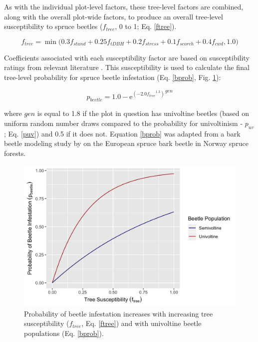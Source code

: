 \documentclass[a4paper, 12pt] {report}
\begin{document}
As with the individual plot-level factors, these tree-level factors are combined, along with the overall plot-wide factors, to produce an overall tree-level susceptibility to spruce beetles ($f_{tree}$, 0 to 1; Eq. \ref{ftree}). 

\begin{equation} \label{ftree}
f_{tree} = \min\Big(0.3f_{stand} + 0.25f_{tDBH} + 0.2f_{stress} + 0.1f_{scorch} + 0.4f_{cwd}, 1.0\Big)
\end{equation}

Coefficients associated with each susceptibility factor are based on susceptibility ratings from relevant literature . This susceptibility is used to calculate the final tree-level probability for spruce beetle infestation (Eq. \ref{bprob}, Fig. \ref{fig:bbprob}):

\begin{equation} \label{bprob}
p_{beetle} = 1.0 - {\text{e}^{(-2.0{f_{tree}}^{1.3})}}^{gen}
\end{equation}

where $gen$ is equal to 1.8 if the plot in question has univoltine beetles (based on uniform random number draws compared to the probability for univoltinism - $p_{uv}$; Eq. \ref{puv}) and 0.5 if it does not. Equation \ref{bprob} was adapted from a bark beetle modeling study by  on the European spruce bark beetle in Norway spruce forests.

\begin{figure}
  \includegraphics[width=0.8\linewidth]{Figures/pbeetle.png}
  \caption{Probability of beetle infestation increases with increasing tree susceptibility ($f_{tree}$, Eq. \ref{ftree}) and with univoltine beetle populations (Eq. \ref{bprob}).}
  \label{fig:bbprob}
\end{figure}
\end{document}

